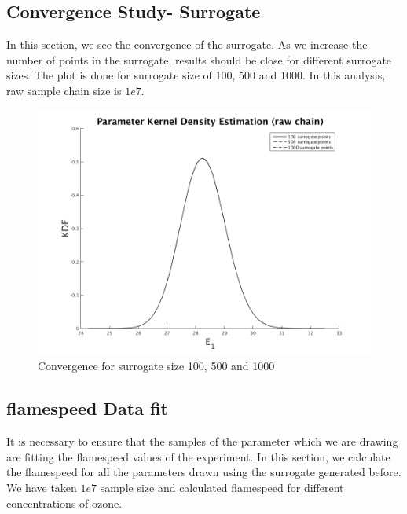 \subsection{Convergence Study- Surrogate }

\noindent In this section, we see the convergence of the surrogate. As we increase the number of points in the surrogate, results should be close for different surrogate sizes. The plot is done for surrogate size of 100, 500 and 1000. In this analysis, raw sample chain size is $1e7$. 

\begin{figure}[H]
\centering
\includegraphics[scale=0.7]{model_1/conv_surrogate} 
    \caption{Convergence for surrogate size 100, 500 and 1000}
\end{figure}


\subsection{flamespeed Data fit}

\noindent It is necessary to ensure that the samples of the parameter which we are drawing are fitting the flamespeed values of the experiment. In this section, we calculate the flamespeed for all the parameters drawn using the surrogate generated before. We have taken $1e7$ sample size and calculated flamespeed for different concentrations of ozone. 

